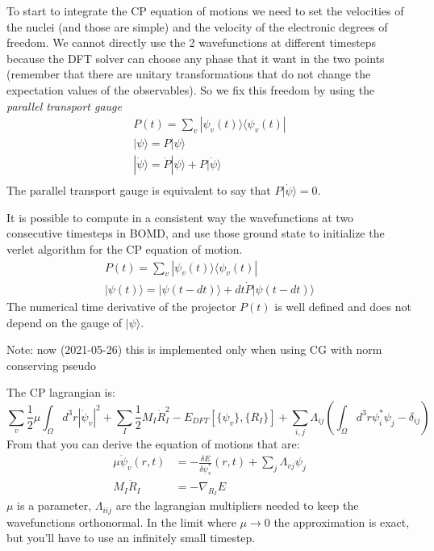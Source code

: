 \documentclass[landscape]{foils}
\begin{document}
To start to integrate the CP equation of motions we need to set the velocities of the nuclei (and those are simple) and the velocity of the electronic degrees of freedom. We cannot directly use the 2 wavefunctions at different timesteps because the DFT solver can choose any phase that it want in the two points (remember that there are unitary transformations that do not change the expectation values of the observables). So we fix this freedom by using the \emph{parallel transport gauge}
\begin{align}
	P(t) = \sum_{v}|\psi_v(t)\rangle\langle\psi_v(t)|\\
	|\psi\rangle = P|\psi\rangle\\
	|\dot\psi\rangle = \dot P|\psi\rangle + P |\dot\psi\rangle\\
\end{align}
The parallel transport gauge is equivalent to say that $P |\dot\psi\rangle=0$.

It is possible to compute in a consistent way the wavefunctions at two consecutive timesteps in BOMD, and use those ground state to initialize the verlet algorithm for the CP equation of motion. 
\begin{align}
	P(t) = \sum_{v}|\psi_v(t)\rangle\langle\psi_v(t)|\\
	|\psi(t)\rangle = |\psi(t-dt)\rangle + dt\dot P |\psi(t-dt)\rangle
\end{align}
The numerical time derivative of the projector $P(t)$ is well defined and does not depend on the gauge of $|\psi\rangle$.

{\small Note: now (2021-05-26) this is implemented only when using CG with norm conserving pseudo}

The CP lagrangian is:
\begin{equation}
    \sum_v\frac{1}{2}\mu\int_{\Omega}d^3r|\dot\psi_v|^2+\sum_I\frac{1}{2}M_I\dot R_I^2-E_{DFT}[\{\psi_v\},\{R_I\}] + \sum_{i,j}\Lambda_{ij}\left(\int_{\Omega}d^3r\psi_i^*\psi_j-\delta_{ij}\right)
\end{equation}
From that you can derive the equation of motions that are:
\begin{align}
    \mu\ddot\psi_v(r,t)&=-\frac{\delta E}{\delta\psi_v^*}(r,t)+\sum_{j}\Lambda_{vj}\psi_j \\
    M_I\ddot R_I &= - \nabla_{R_I} E
\end{align}
$\mu$ is a parameter, $\Lambda_{iij}$ are the lagrangian multipliers needed to keep the wavefunctions orthonormal. In the limit where $\mu \to 0$ the approximation is exact, but you'll have to use an infinitely small timestep.
\end{document}
